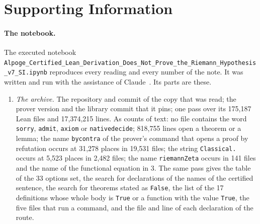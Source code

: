\documentclass[11pt]{article}
\theoremstyle{definition}
\theoremstyle{remark}
\DeclareRobustCommand{\lean}[1]{{\renewcommand{\_}{\textunderscore\allowbreak}\texttt{#1}}}
\newcommand{\True}{\lean{True}}
\newcommand{\False}{\lean{False}}
\begin{document}
\appendix

\section{Supporting Information}\label{app:si}

\paragraph{The notebook.} The executed notebook \nolinkurl{Alpoge_Certified_Lean_Derivation_Does_Not_Prove_the_Riemann_Hypothesis_v7_SI.ipynb} reproduces every reading and every number of the note. It was written and run with the assistance of Claude~\citep{claude}. Its parts are these.
\begin{enumerate}[leftmargin=2em,itemsep=1pt]
\item \emph{The archive.} The repository and commit of the copy that was read; the prover version and the library commit that it pins; one pass over its 175{,}187 Lean files and 17{,}374{,}215 lines. As counts of text: no file contains the word \lean{sorry}, \lean{admit}, \lean{axiom} or \lean{native\_decide}; 818{,}755 lines open a theorem or a lemma; the name \lean{by\_contra} of the prover's command that opens a proof by refutation occurs at 31{,}278 places in 19{,}531 files; the string \lean{Classical.} occurs at 5{,}523 places in 2{,}482 files; the name \lean{riemannZeta} occurs in 141 files and the name of the functional equation in 3. The same pass gives the table of the 33 options set, the search for declarations of the names of the certified sentence, the search for theorems stated as \False, the list of the 17 definitions whose whole body is \True{} or a function with the value \True, the five files that run a command, and the file and line of each declaration of the route.

\end{enumerate}
\end{document}
